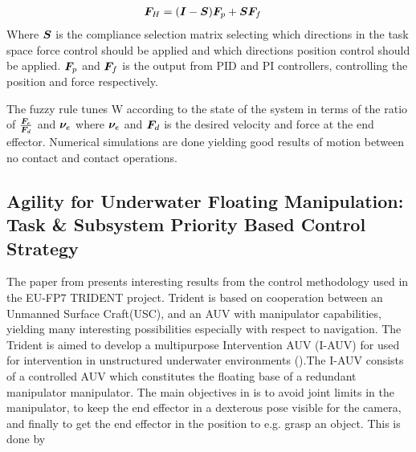 \begin{align}
  \boldsymbol F_H&= (\boldsymbol I - \boldsymbol S)\boldsymbol F_p + \boldsymbol S \boldsymbol F_f
  \label{eq:hybrid1}
\end{align}
Where $\boldsymbol S$ is the compliance selection matrix selecting which directions in the task space force control should be applied and which directions position control should be applied. $\boldsymbol F_p$ and $\boldsymbol F_f$ is the output from PID and PI controllers, controlling the position and force respectively.


The fuzzy rule tunes W according to the state of the system in terms of the ratio of $\frac{\boldsymbol F_e}{\boldsymbol F_d}$  and $\boldsymbol \nu_e$ where $\boldsymbol \nu_e$ and $\boldsymbol F_d$ is the desired velocity and force at the end effector. 
Numerical simulations are done yielding good results of motion between no contact and contact operations. 





\subsection{Agility for Underwater Floating Manipulation: Task \& Subsystem Priority Based Control Strategy}
The paper from \cite{trident_1} presents interesting results from the control methodology used in the EU-FP7 TRIDENT project. Trident is based on cooperation between an Unmanned Surface Craft(USC), and an AUV with manipulator capabilities, yielding many interesting possibilities especially with respect to navigation. The Trident is aimed to develop a multipurpose Intervention AUV (I-AUV) for used for intervention in unstructured underwater environments (\cite{trident1}).The I-AUV consists of a controlled AUV which constitutes the floating base of a redundant manipulator manipulator.  The main objectives in \cite{trident_1} is to avoid joint limits in the manipulator, to keep the end effector in a dexterous pose visible for the camera, and finally to get the end effector in the position to e.g. grasp an object. This is done by  

\newcommand*{\mybox}[2]{\colorbox{#1!30}{\parbox{.98\linewidth}{#2}}}



